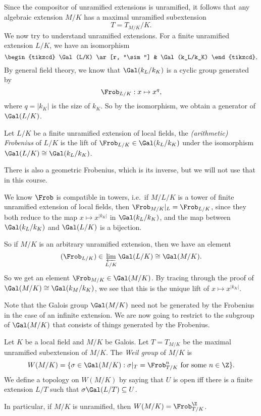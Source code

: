 \documentclass[a4paper]{article}
\begin{document}
Since the compositor of unramified extensions is unramified, it follows that any algebraic extension $M/K$ has a maximal unramified subextension
\[
  T = T_{M/K}/K.
\]
We now try to understand unramified extensions. For a finite unramified extension $L/K$, we have an isomorphism
\[
  \begin{tikzcd}
    \Gal(L/K) \ar[r, "\sim"] & \Gal(k_L/k_K)
  \end{tikzcd},
\]
By general field theory, we know that $\Gal(k_L/k_K)$ is a cyclic group generated by
\[
  \Frob_{L/K}: x \mapsto x^q,
\]
where $q = |k_K|$ is the size of $k_K$. So by the isomorphism, we obtain a generator of $\Gal(L/K)$.

\begin{defi}
  Let $L/K$ be a finite unramified extension of local fields, the \emph{(arithmetic) Frobenius} of $L/K$ is the lift of $\Frob_{L/K} \in \Gal(k_L/k_K)$ under the isomorphism $\Gal(L/K) \cong \Gal(k_L/k_K)$.
\end{defi}
There is also a geometric Frobenius, which is its inverse, but we will not use that in this course.

We know $\Frob$ is compatible in towers, i.e.\ if $M/L/K$ is a tower of finite unramified extension of local fields, then $\Frob_{M/K}|_L = \Frob_{L/K}$, since they both reduce to the map $x \mapsto x^{|k_K|}$ in $\Gal(k_L/k_K)$, and the map between $\Gal(k_L/k_K)$ and $\Gal(L/K)$ is a bijection.

So if $M/K$ is an arbitrary unramified extension, then we have an element
\[
  (\Frob_{L/K}) \in \varprojlim_{L/K} \Gal(L/K) \cong \Gal(M/K).
\]
So we get an element $\Frob_{M/K} \in \Gal(M/K)$. By tracing through the proof of $\Gal(M/K) \cong \Gal(k_M/k_K)$, we see that this is the unique lift of $x \mapsto x^{|k_K|}$.

Note that the Galois group $\Gal(M/K)$ need not be generated by the Frobenius in the case of an infinite extension. We are now going to restrict to the subgroup of $\Gal(M/K)$ that consists of things generated by the Frobenius.

\begin{defi}
  Let $K$ be a local field and $M/K$ be Galois. Let $T = T_{M/K}$ be the maximal unramified subextension of $M/K$. The \emph{Weil group} of $M/K$ is
  \[
    W(M/K) = \{\sigma \in \Gal(M/K): \sigma|_T = \Frob_{T/K}^n\text{ for some }n \in \Z\}.
  \]
  We define a topology on $W(M/K)$ by saying that $U$ is open iff there is a finite extension $L/T$ such that $\sigma \Gal(L/T) \subseteq U$.
\end{defi}
In particular, if $M/K$ is unramified, then $W(M/K) = \Frob_{T/K}^\Z$.
\end{document}
